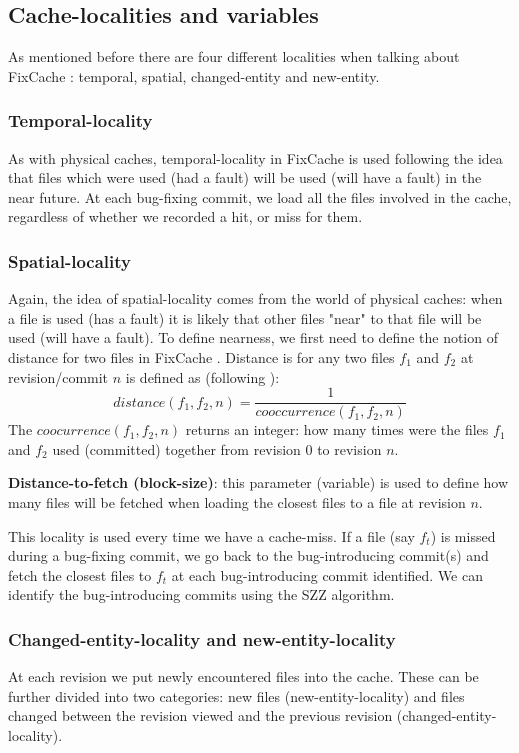 \documentclass[12pt,twoside,notitlepage]{report}
\newcommand{\fxch}{FixCache }
\begin{document}
\subsection{Cache-localities and variables}\label{variables}
As mentioned before there are four different localities when talking about \fxch: temporal, spatial, changed-entity and new-entity. 
\subsubsection{Temporal-locality}
As with physical caches, temporal-locality in \fxch is used following the idea that files which were used (had a fault) will be used (will have a fault) in the near future. At each bug-fixing commit, we load all the files involved in the cache, regardless of whether we recorded a hit, or miss for them.
\subsubsection{Spatial-locality}
Again, the idea of spatial-locality comes from the world of physical caches: when a file is used (has a fault) it is likely that other files "near" to that file will be used (will have a fault). To define nearness, we first need to define the notion of distance for two files in \fxch. Distance is for any two files $f_1$ and $f_2$ at revision/commit $n$ is defined as (following \cite{FixCache}):
\[
	distance(f_1, f_2, n) = \frac{1}{cooccurrence(f_1, f_2, n)}
\]
The $coocurrence(f_1, f_2, n)$ returns an integer: how many times were the files $f_1$ and $f_2$ used (committed) together from revision $0$ to revision $n$.

\textbf{Distance-to-fetch (block-size)}: this parameter (variable) is used to define how many files will be fetched when loading the closest files to a file at revision $n$.

This locality is used every time we have a cache-miss. If a file (say $f_t$) is missed during a bug-fixing commit, we go back to the bug-introducing commit(s) and fetch the closest files to $f_t$ at each bug-introducing commit identified. We can identify the bug-introducing commits using the SZZ algorithm\cite{SZZ}.
\subsubsection{Changed-entity-locality and new-entity-locality}
At each revision we put newly encountered files into the cache. These can be further divided into two categories: new files (new-entity-locality) and files changed between the revision viewed and the previous revision (changed-entity-locality). 
\end{document}
